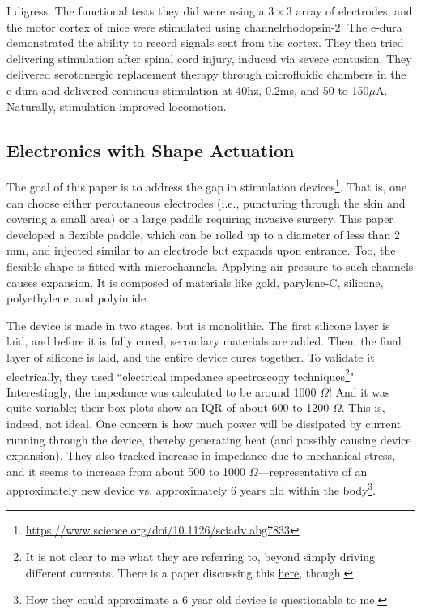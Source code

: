 I digress. The functional tests they did were using a $3\times3$ array of electrodes, and the motor cortex of mice were stimulated using channelrhodopsin-2. The e-dura demonstrated the ability to record signals sent from the cortex. They then tried delivering stimulation after spinal cord injury, induced via severe contusion. They delivered serotonergic replacement therapy through microfluidic chambers in the e-dura and delivered continous stimulation at 40hz, 0.2ms, and 50 to 150$\mu$A. Naturally, stimulation improved locomotion. 

\subsection{Electronics with Shape Actuation}

The goal of this paper is to address the gap in stimulation devices\footnote{\url{https://www.science.org/doi/10.1126/sciadv.abg7833}}. That is, one can choose either percutaneous electrodes (i.e., puncturing through the skin and covering a small area) or a large paddle requiring invasive surgery. This paper developed a flexible paddle, which can be rolled up to a diameter of less than 2 mm, and injected similar to an electrode but expands upon entrance. Too, the flexible shape is fitted with microchannels. Applying air pressure to such channels causes expansion. It is composed of materials like gold, parylene-C, silicone, polyethylene, and polyimide.\newline 

The device is made in two stages, but is monolithic. The first silicone layer is laid, and before it is fully cured, secondary materials are added. Then, the final layer of silicone is laid, and the entire device cures together. To validate it electrically, they used ``electrical impedance spectroscopy techniques\footnote{It is not clear to me what they are referring to, beyond simply driving different currents. There is a paper discussing this \href{https://www.ncbi.nlm.nih.gov/pmc/articles/PMC8512860/}{here}, though.}" Interestingly, the impedance was calculated to be around 1000 $\Omega$! And it was quite variable; their box plots show an IQR of about 600 to 1200 $\Omega$. This is, indeed, not ideal. One concern is how much power will be dissipated by current running through the device, thereby generating heat (and possibly causing device expansion). They also tracked increase in impedance due to mechanical stress, and it seems to increase from about 500 to 1000 $\Omega$---representative of an approximately new device vs. approximately 6 years old within the body\footnote{How they could approximate a 6 year old device is questionable to me.}.\newline


